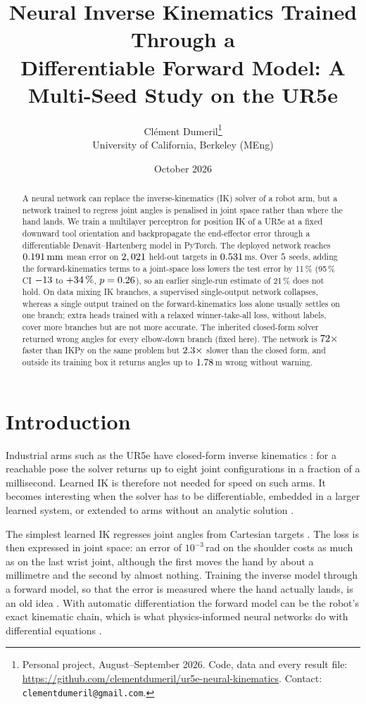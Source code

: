 \documentclass[11pt]{article}
\title{Neural Inverse Kinematics Trained Through a\\
Differentiable Forward Model: A Multi-Seed Study on the UR5e}
\author{Cl\'ement Dumeril\thanks{Personal project, August--September 2026.
Code, data and every result file: \url{https://github.com/clementdumeril/ur5e-neural-kinematics}.
Contact: \texttt{clementdumeril@gmail.com}.}\\[2pt]
{\small University of California, Berkeley (MEng)}}
\date{October 2026}
\newcommand{\mm}{\,\mathrm{mm}}
\begin{document}
\maketitle

\begin{abstract}
A neural network can replace the inverse-kinematics (IK) solver of a robot arm,
but a network trained to regress joint angles is penalised in joint space
rather than where the hand lands. We train a multilayer perceptron for position
IK of a UR5e at a fixed downward tool orientation and backpropagate the
end-effector error through a differentiable Denavit--Hartenberg model in
PyTorch. The deployed network reaches $\shipTestPos\mm$ mean error on
$2,021$ held-out targets in $0.531$\,ms. Over $5$ seeds,
adding the forward-kinematics terms to a joint-space loss lowers the test error
by 11\,\% (95\,\% CI $-13$ to $+34\,\%$, $p=0.26$), so an earlier
single-run estimate of 21\,\% does not hold. On data mixing IK branches, a
supervised single-output network collapses, whereas a single output trained on
the forward-kinematics loss alone usually settles on one branch; extra heads
trained with a relaxed winner-take-all loss, without labels, cover more
branches but are not more accurate. The inherited closed-form solver returned
wrong angles for every elbow-down branch (fixed here). The network is
$72\times$ faster than IKPy on the same problem but
$2.3\times$ slower than the closed form, and outside its training
box it returns angles up to $1.78$\,m wrong without warning.
\end{abstract}

\section{Introduction}
Industrial arms such as the UR5e have closed-form inverse kinematics
\citep{hawkins2013ur}: for a reachable pose the solver returns up to eight
joint configurations in a fraction of a millisecond. Learned IK is therefore
not needed for speed on such arms. It becomes interesting when the solver has to be
differentiable, embedded in a larger learned system, or extended to arms
without an analytic solution \citep{dsouza2001learning,ames2022ikflow}.

The simplest learned IK regresses joint angles from Cartesian targets
\citep{duka2014neural}. The loss is then expressed in joint space: an error of
$10^{-3}$\,rad on the shoulder costs as much as on the last wrist joint,
although the first moves the hand by about a millimetre and the second by
almost nothing. Training the inverse model through a forward model, so that the
error is measured where the hand actually lands, is an old idea
\citep{jordan1992distal}. With automatic differentiation the forward model can
be the robot's exact kinematic chain, which is what physics-informed neural
networks do with differential equations \citep{raissi2019pinn,karniadakis2021piml}.
\end{document}
